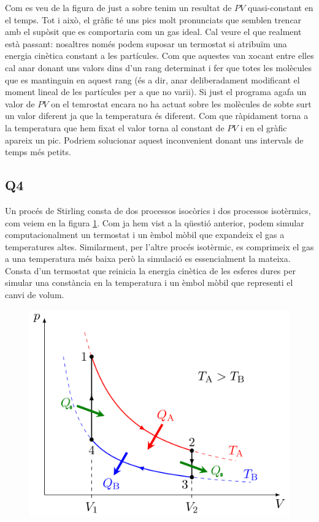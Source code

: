 \documentclass{article}
\begin{document}
	Com es veu de la figura de just a sobre tenim un resultat de $PV$ quasi-constant en el temps. Tot i això, el gràfic té uns pics molt pronunciats que semblen trencar amb el supòsit que es comportaria com un gas ideal. Cal veure el que realment està passant: nosaltres només podem suposar un termostat si atribuïm una energia cinètica constant a les partícules. Com que aquestes van xocant entre elles cal anar donant uns valors dins d'un rang determinat i fer que totes les molècules que es mantinguin en aquest rang (és a dir, anar deliberadament modificant el moment lineal de les partícules per a que no varii). Si just el programa agafa un valor de $PV$ on el temrostat encara no ha actuat sobre les molècules de sobte surt un valor diferent ja que la temperatura és diferent. Com que ràpidament torna a la temperatura que hem fixat el valor torna al constant de $PV$ i en el gràfic apareix un pic. Podriem solucionar aquest inconvenient donant uns intervals de temps més petits.
	
	
	
	\subsection*{Q4}
	Un procés de Stirling consta de dos processos isocòrics i dos processos isotèrmics, com veiem en la figura \ref{gurururur}.
	Com ja hem vist a la qüestió anterior, podem simular computacionalment un termostat i un èmbol mòbil que expandeix el gas a temperatures altes. Similarment, per l'altre procés isotèrmic, es comprimeix el gas a una temperatura més baixa però la simulació es essencialment la mateixa. Consta d'un termostat que reinicia la energia cinètica de les esferes dures per simular una constància en la temperatura i un èmbol mòbil que representi el canvi de volum.\\
	\begin{figure}[h!]
		\centering
		\includegraphics[width=0.5\linewidth]{Ciclo_de_Stirling_pV.png}
		\caption{}
		\label{gurururur}
	\end{figure}	
	
\end{document}
